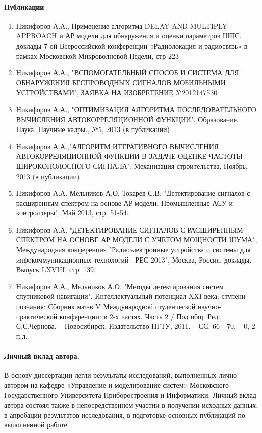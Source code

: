 \paragraph{Публикации}
\begin{enumerate}
	\item Никифоров А.А., Применение алгоритма DELAY AND MULTIPLY APPROACH и АР модели для обнаружения и оценки параметров ШПС. 
		доклады 7-ой Всероссийской конференции «Радиолокация и радиосвязь» в рамках Московской Микроволновой Недели, стр 223 
	\item Никифоров А.А., "ВСПОМОГАТЕЛЬНЫЙ СПОСОБ И СИСТЕМА ДЛЯ ОБНАРУЖЕНИЯ БЕСПРОВОДНЫХ СИГНАЛОВ
	        МОБИЛЬНЫМИ УСТРОЙСТВАМИ", ЗАЯВКА НА ИЗОБРЕТЕНИЕ №2012147530
	\item Никифоров А.А., "ОПТИМИЗАЦИЯ АЛГОРИТМА ПОСЛЕДОВАТЕЛЬНОГО ВЫЧИСЛЕНИЯ АВТОКОРРЕЛЯЦИОННОЙ ФУНКЦИИ".
		Образование. Наука. Научные кадры., №5, 2013 (в публикации)
	\item Никифоров А.А.,"АЛГОРИТМ ИТЕРАТИВНОГО ВЫЧИСЛЕНИЯ АВТОКОРРЕЛЯЦИОННОЙ ФУНКЦИИ В ЗАДАЧЕ ОЦЕНКЕ ЧАСТОТЫ ШИРОКОПОЛОСНОГО СИГНАЛА".
		Механизация строительства, Ноябрь, 2013 (в публикации)
	\item Никифоров А.А. Мельников А.О. Токарев С.В. "Детектирование сигналов с расширенным спектром на основе АР модели, Промышленные АСУ и контроллеры", Май 2013, стр. 51-54.
	\item Никифоров А.А. "ДЕТЕКТИРОВАНИЕ СИГНАЛОВ С РАСШИРЕННЫМ СПЕКТРОМ НА ОСНОВЕ АР МОДЕЛИ С УЧЕТОМ МОЩНОСТИ ШУМА", Международная конференция
		"Радиоэлектронные устройства и системы для инфокоммуникационных технологий - РЕС-2013", Москва, Россия, доклады. Выпуск LXVIII. стр. 139.
	\item Никифоров А.А., Мельников А.О. "Методы детектирования систем спутниковой навигации". Интеллектуальный потенциал XXI века: ступени познания:
		Сборник мат-в V Международной студенческой научно-практической конференции: в 2-х частях. Часть 2 / Под общ. Ред. С.С.Чернова. – Новосибирск:
		Издательство НГТУ, 2011. – СС. 66 - 70. – 0, 2 п.л.
\end{enumerate}

\paragraph{Личный вклад автора.}
В основу диссертации легли результаты исследований, выполненных лично автором на кафедре «Управление и моделирование систем» Московского Государственного
Университета Приборостроения и Информатики. Личный вклад автора состоял также в непосредственном участии в получении исходных данных, в апробации результатов исследования,
в подготовке основных публикаций по выполненной работе.

